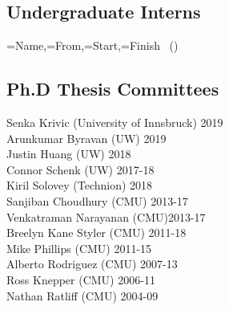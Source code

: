 \subsection{Undergraduate Interns}
\noindent
{}
{\name=Name,\from=From,\start=Start,\finish=Finish}
{\name~(\from) \hfill \DTLifnullorempty{\start}{}{\start-}\finish\\
}

\subsection{Ph.D Thesis Committees}
\noindent
Senka Krivic (University of Innsbruck) \hfill 2019\\
Arunkumar Byravan (UW) \hfill 2019\\
Justin Huang (UW) \hfill 2018\\
Connor Schenk (UW) \hfill 2017-18\\
Kiril Solovey (Technion) \hfill 2018\\
Sanjiban Choudhury (CMU) \hfill 2013-17\\
Venkatraman Narayanan (CMU)\hfill 2013-17\\
Breelyn Kane Styler (CMU) \hfill 2011-18\\ 
Mike Phillips (CMU) \hfill 2011-15\\
Alberto Rodriguez (CMU) \hfill 2007-13\\
Ross Knepper  (CMU) \hfill 2006-11\\
Nathan Ratliff (CMU) \hfill 2004-09\\
